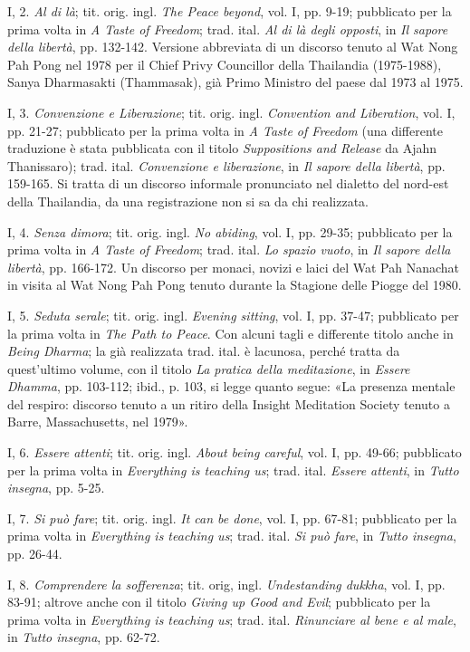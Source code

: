 I, 2. \emph{Al di là}; tit. orig. ingl. \emph{The Peace beyond}, vol. I,
pp. 9-19; pubblicato per la prima volta in \emph{A Taste of Freedom};
trad. ital. \emph{Al di là degli opposti}, in \emph{Il sapore della
libertà}, pp. 132-142. Versione abbreviata di un discorso tenuto al Wat
Nong Pah Pong nel 1978 per il Chief Privy Councillor della Thailandia
(1975-1988), Sanya Dharmasakti (Thammasak), già Primo Ministro del paese
dal 1973 al 1975.

I, 3. \emph{Convenzione e Liberazione}; tit. orig. ingl.
\emph{Convention and Liberation}, vol. I, pp. 21-27; pubblicato per la
prima volta in \emph{A Taste of Freedom} (una differente traduzione è
stata pubblicata con il titolo \emph{Suppositions and Release} da Ajahn
Thanissaro); trad. ital. \emph{Convenzione e liberazione}, in \emph{Il
sapore della libertà}, pp. 159-165. Si tratta di un discorso informale
pronunciato nel dialetto del nord-est della Thailandia, da una
registrazione non si sa da chi realizzata.

I, 4. \emph{Senza dimora}; tit. orig. ingl. \emph{No abiding}, vol. I,
pp. 29-35; pubblicato per la prima volta in \emph{A Taste of Freedom};
trad. ital. \emph{Lo spazio vuoto}, in \emph{Il sapore della libertà},
pp. 166-172. Un discorso per monaci, novizi e laici del Wat Pah Nanachat
in visita al Wat Nong Pah Pong tenuto durante la Stagione delle Piogge
del 1980.

I, 5. \emph{Seduta serale}; tit. orig. ingl. \emph{Evening sitting},
vol. I, pp. 37-47; pubblicato per la prima volta in \emph{The Path to
Peace}. Con alcuni tagli e differente titolo anche in \emph{Being
Dharma}; la già realizzata trad. ital. è lacunosa, perché tratta da
quest'ultimo volume, con il titolo \emph{La pratica della meditazione},
in \emph{Essere Dhamma}, pp. 103-112; ibid., p. 103, si legge quanto
segue: «La presenza mentale del respiro: discorso tenuto a un ritiro
della Insight Meditation Society tenuto a Barre, Massachusetts, nel
1979».

I, 6. \emph{Essere attenti}; tit. orig. ingl. \emph{About being
careful}, vol. I, pp. 49-66; pubblicato per la prima volta in
\emph{Everything is teaching us}; trad. ital. \emph{Essere attenti}, in
\emph{Tutto insegna}, pp. 5-25.

I, 7. \emph{Si può fare}; tit. orig. ingl. \emph{It can be done}, vol.
I, pp. 67-81; pubblicato per la prima volta in \emph{Everything is
teaching us}; trad. ital. \emph{Si può fare}, in \emph{Tutto insegna},
pp. 26-44.

I, 8. \emph{Comprendere la sofferenza}; tit. orig, ingl.
\emph{Undestanding dukkha}, vol. I, pp. 83-91; altrove anche con il
titolo \emph{Giving up Good and Evil}; pubblicato per la prima volta in
\emph{Everything is teaching us}; trad. ital. \emph{Rinunciare al bene e
al male}, in \emph{Tutto insegna}, pp. 62-72.

